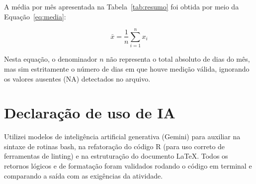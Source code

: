 \documentclass[12pt,a4paper]{article}
\begin{document}
A média por mês apresentada na Tabela~\ref{tab:resumo} foi obtida por meio da Equação~\eqref{eq:media}:

\begin{equation}
  \label{eq:media}
  \bar{x} = \frac{1}{n} \sum_{i=1}^{n} x_i
\end{equation}

Nesta equação, o denominador $n$ não representa o total absoluto de dias do mês, mas sim estritamente o número de dias em que houve medição válida, ignorando os valores ausentes (NA) detectados no arquivo.

\section*{Declaração de uso de IA}

\hspace{\parindent}Utilizei modelos de inteligência artificial generativa (Gemini) para auxiliar na sintaxe de rotinas bash, na refatoração do código R (para uso correto de ferramentas de linting) e na estruturação do documento LaTeX. Todos os retornos lógicos e de formatação foram validados rodando o código em terminal e comparando a saída com as exigências da atividade.



\end{document}
